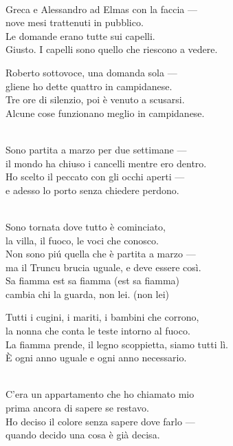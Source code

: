 \begin{lyrics}


\\
Greca e Alessandro ad Elmas con la faccia —\\
nove mesi trattenuti in pubblico.\\
Le domande erano tutte sui capelli.
\\
Giusto. %
I capelli sono quello che riescono a vedere.

Roberto sottovoce, una domanda sola —\\
gliene ho dette quattro in campidanese.\\
Tre ore di silenzio, poi è venuto a scusarsi.
\\
Alcune cose funzionano meglio in campidanese.

\\
Sono partita a marzo per due settimane —\\
il mondo ha chiuso i cancelli mentre ero dentro.\\
Ho scelto il peccato con gli occhi aperti —\\
e adesso lo porto senza chiedere perdono.

\\
Sono tornata dove tutto è cominciato,\\
la villa, il fuoco, le voci che conosco.\\
Non sono piú quella che è partita a marzo —\\
ma il Truncu brucia uguale, e deve essere così.
\\
Sa fiamma est sa fiamma (est sa fiamma)\\
cambia chi la guarda, non lei. %
(non lei)

Tutti i cugini, i mariti, i bambini che corrono,\\
la nonna che conta le teste intorno al fuoco.\\
La fiamma prende, il legno scoppietta, siamo tutti lì.
\\
È ogni anno uguale e ogni anno necessario.

\\
C'era un appartamento che ho chiamato mio\\
prima ancora di sapere se restavo.\\
Ho deciso il colore senza sapere dove farlo —\\
quando decido una cosa è già decisa.


\end{lyrics}

